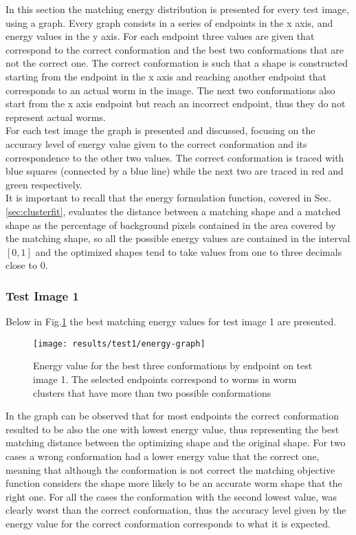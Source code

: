 In this section the matching energy distribution is presented 
for every test image, using a graph. 
Every graph consists in a series of endpoints in the
x axis, and energy values in the y axis. For each endpoint three values 
are given that correspond to the correct conformation and the best two 
conformations that are not the correct one. The correct conformation
is such that a shape is constructed starting from the endpoint in the
x axis and reaching another endpoint that corresponds to an actual
worm in the image. The next two conformations also start from the x axis
endpoint but reach an incorrect endpoint, thus they do not represent 
actual worms.\\
For each test image the graph is presented and discussed, focusing 
on the accuracy level of energy value given to the correct conformation
and its correspondence to the other two values. The correct conformation
is traced with blue squares (connected by a blue line) while the next two
are traced in red and green respectively.\\
It is important to recall that the energy formulation function, covered
in Sec.\ref{sec:clusterfit}, evaluates the distance between a matching shape
and a matched shape as the percentage of background pixels contained in the 
area covered by the matching shape, so all the possible energy values are
contained in the interval $[0,1]$ and the optimized shapes tend to take values
from one to three decimals close to $0$.

\subsubsection*{Test Image 1}

Below in Fig.\ref{fig:energy1} the best matching energy values for 
test image 1 are presented.

\begin{figure}[h]
 \centering
   \texttt{[image: results/test1/energy-graph]}
 \caption{Energy value for the best three conformations by endpoint on test
image 1. The selected endpoints correspond to worms in worm clusters that
have more than two possible conformations}
\label{fig:energy1}
\end{figure}

In the graph can be observed that for most endpoints the correct conformation
resulted to be also the one with lowest energy value, thus representing
the best matching distance between the optimizing shape and the original shape.
For two cases a wrong conformation had a lower energy value that the correct
one, meaning that 
although the conformation is not correct the matching objective function
considers the shape more likely to be an accurate worm shape that the right
one. For all the cases the conformation with the second lowest value, was
clearly worst than the correct conformation, thus the accuracy level given
by the energy value for the correct conformation corresponds to what it is 
expected.\\

